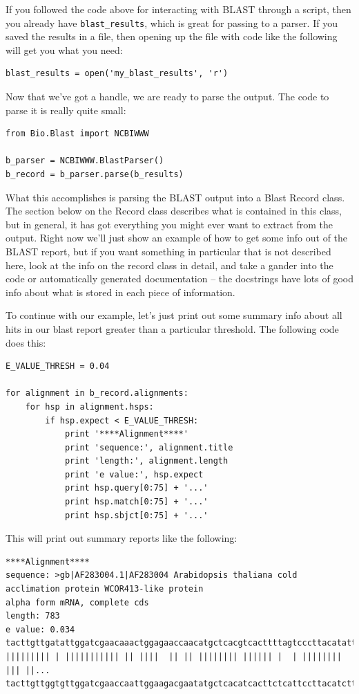 \documentclass{report}
\begin{document}
If you followed the code above for interacting with BLAST through a
script, then you already have \verb|blast_results|, which is great for
passing to a parser. If you saved the results in a file, then opening
up the file with code like the following will get you what you need:


\begin{verbatim}
blast_results = open('my_blast_results', 'r')
\end{verbatim}


Now that we've got a handle, we are ready to parse the output. The
code to parse it is really quite small:


\begin{verbatim}
from Bio.Blast import NCBIWWW

b_parser = NCBIWWW.BlastParser()
b_record = b_parser.parse(b_results)
\end{verbatim}

What this accomplishes is parsing the BLAST output into a Blast Record
class. The section below on the Record class describes what is
contained in this class, but in general, it has got everything you
might ever want to extract from the output. Right now we'll just show
an example of how to get some info out of the BLAST report, but if you
want something in particular that is not described here, look at the
info on the record class in detail, and take a gander into the code or
automatically generated documentation -- the docstrings have lots of
good info about what is stored in each piece of information.


To continue with our example, let's just print out some summary info
about all hits in our blast report greater than a particular
threshold. The following code does this:

\begin{verbatim}
E_VALUE_THRESH = 0.04

for alignment in b_record.alignments:
    for hsp in alignment.hsps:
        if hsp.expect < E_VALUE_THRESH:
            print '****Alignment****'
            print 'sequence:', alignment.title
            print 'length:', alignment.length
            print 'e value:', hsp.expect
            print hsp.query[0:75] + '...'
            print hsp.match[0:75] + '...'
            print hsp.sbjct[0:75] + '...'
\end{verbatim}

This will print out summary reports like the following:

\begin{verbatim}
****Alignment****
sequence: >gb|AF283004.1|AF283004 Arabidopsis thaliana cold acclimation protein WCOR413-like protein
alpha form mRNA, complete cds
length: 783
e value: 0.034
tacttgttgatattggatcgaacaaactggagaaccaacatgctcacgtcacttttagtcccttacatattcctc...
||||||||| | ||||||||||| || ||||  || || |||||||| |||||| |  | |||||||| ||| ||...
tacttgttggtgttggatcgaaccaattggaagacgaatatgctcacatcacttctcattccttacatcttcttc...
\end{verbatim}
\end{document}
